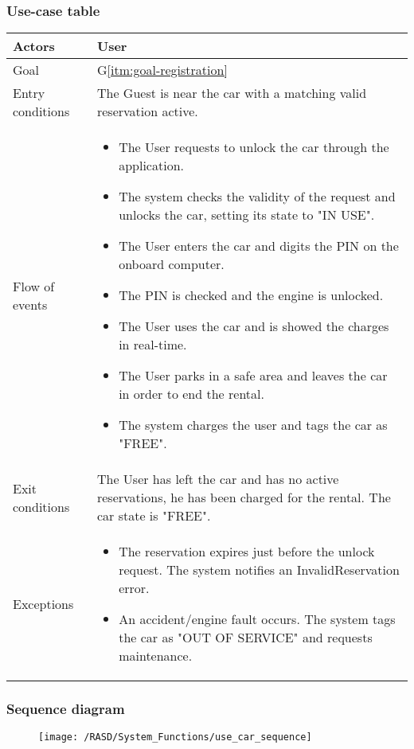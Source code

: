 \subsubsection{Use-case table}
\begin{center}
  \begin{tabular}{ l | p{10cm} }
    \hline
    Actors & User\\ \hline
    Goal & G\ref{itm:goal-registration}\\ \hline
    Entry conditions & The Guest is near the car with a matching valid reservation active. 
     \\ \hline
    Flow of events &
    \begin{itemize} %
      \item The User requests to unlock the car through the application.
      \item The system checks the validity of the request and unlocks the car, setting its state to "IN USE".
      \item The User enters the car and digits the PIN on the onboard computer.
      \item The PIN is checked and the engine is unlocked.
      \item The User uses the car and is showed the charges in real-time.
      \item The User parks in a safe area and leaves the car in order to end the rental.
      \item The system charges the user and tags the car as "FREE".
    \end{itemize} \\ \hline
    Exit conditions & The User has left the car and has no active reservations, he has been charged for the rental. The car state is "FREE". \\ \hline
  	Exceptions & 
    \begin{itemize}
      \item The reservation expires just before the unlock request. The system notifies an InvalidReservation error.
      \item An accident/engine fault occurs. The system tags the car as "OUT OF SERVICE" and requests maintenance.
    \end{itemize} \\ \hline
  \end{tabular}
\end{center}

\newpage
\subsubsection{Sequence diagram}
\begin{figure}[!ht]
  \centering
  \vspace{0.2cm}
  \texttt{[image: /RASD/System\_Functions/use\_car\_sequence]}\\
  \vspace{0.4cm}
  \label{fig:use_car_sequence} 
\end{figure}

